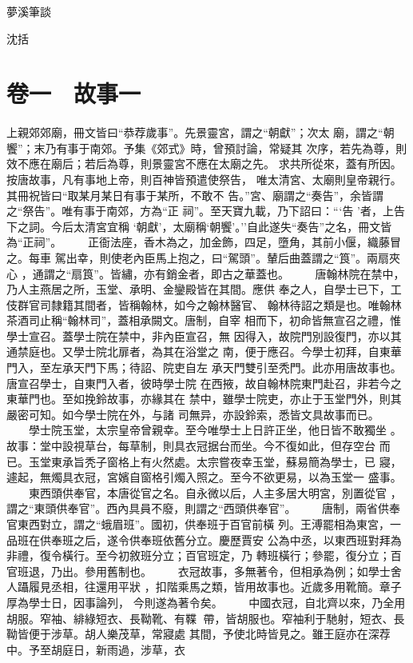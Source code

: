 \documentclass{ctexart}
\begin{document}
\vspace*{\fill}
\Huge
\begin{center}
夢溪筆談
\end{center}
\bigskip
\begin{center}
沈括
\end{center}
\vspace*{\fill}
\clearpage
\normalsize
\tableofcontents
\clearpage
\Large
{}
\section{卷一　故事一}
\paragraph{}
上親郊郊廟，冊文皆曰``恭荐歲事''。先景靈宮，謂之``朝獻''；次太 廟，謂之``朝饗''；末乃有事于南郊。予集《郊式》時，曾預討論，常疑其 次序，若先為尊，則效不應在廟后；若后為尊，則景靈宮不應在太廟之先。 求共所從來，蓋有所因。按唐故事，凡有事地上帝，則百神皆預遣使祭告， 唯太清宮、太廟則皇帝親行。其冊祝皆曰``取某月某日有事于某所，不敢不 告。''宮、廟謂之``奏告''，余皆謂之``祭告''。唯有事于南郊，方為``正 祠''。至天寶九載，乃下詔曰：```告 '者，上告下之詞。今后太清宮宜稱 `朝獻'，太廟稱`朝饗'。''自此遂失``奏告''之名，冊文皆為``正祠''。 　　正衙法座，香木為之，加金飾，四足，墮角，其前小偃，織藤冒之。每車 駕出幸，則使老內臣馬上抱之，曰``駕頭''。輦后曲蓋謂之``筤''。兩扇夾心 ，通謂之``扇筤''。皆繡，亦有銷金者，即古之華蓋也。 　　唐翰林院在禁中，乃人主燕居之所，玉堂、承明、金鑾殿皆在其間。應供 奉之人，自學士已下，工伎群官司隸籍其間者，皆稱翰林，如今之翰林醫官、 翰林待詔之類是也。唯翰林茶酒司止稱``翰林司''，蓋相承闕文。唐制，自宰 相而下，初命皆無宣召之禮，惟學士宣召。蓋學士院在禁中，非內臣宣召，無 因得入，故院門別設復門，亦以其通禁庭也。又學士院北扉者，為其在浴堂之 南，便于應召。今學士初拜，自東華門入，至左承天門下馬；待詔、院吏自左 承天門雙引至秃門。此亦用唐故事也。唐宣召學士，自東門入者，彼時學士院 在西掖，故自翰林院東門赴召，非若今之東華門也。至如挽鈴故事，亦緣其在 禁中，雖學士院吏，亦止于玉堂門外，則其嚴密可知。如今學士院在外，与諸 司無异，亦設鈴索，悉皆文具故事而已。 　　學士院玉堂，太宗皇帝曾親幸。至今唯學士上日許正坐，他日皆不敢獨坐 。故事：堂中設視草台，每草制，則具衣冠据台而坐。今不復如此，但存空台 而已。玉堂東承旨秃子窗格上有火然處。太宗嘗夜幸玉堂，蘇易簡為學士，已 寢，遽起，無燭具衣冠，宮嬪自窗格引燭入照之。至今不欲更易，以為玉堂一 盛事。 　　東西頭供奉官，本唐從官之名。自永微以后，人主多居大明宮，別置從官 ，謂之``東頭供奉官''。西內具員不廢，則謂之``西頭供奉官''。 　　唐制，兩省供奉官東西對立，謂之``蛾眉班''。國初，供奉班于百官前橫 列。王溥罷相為東宮，一品班在供奉班之后，遂令供奉班依舊分立。慶歷賈安 公為中丞，以東西班對拜為非禮，復令橫行。至今初敘班分立；百官班定，乃 轉班橫行；參罷，復分立；百官班退，乃出。參用舊制也。 　　衣冠故事，多無著令，但相承為例；如學士舍人躡履見丞相，往還用平狀 ，扣階乘馬之類，皆用故事也。近歲多用靴簡。章子厚為學士日，因事論列， 今則遂為著令矣。 　　中國衣冠，自北齊以來，乃全用胡服。窄袖、緋綠短衣、長靿靴、有鞢 帶，皆胡服也。窄袖利于馳射，短衣、長靿皆便于涉草。胡人樂茂草，常寢處 其間，予使北時皆見之。雖王庭亦在深荐中。予至胡庭日，新雨過，涉草，衣 
\end{document}
